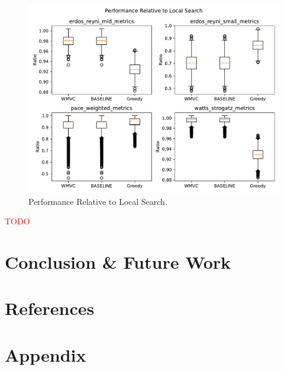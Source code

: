 \documentclass{article}
\begin{document}
\begin{figure}
     \centering
     \includegraphics[width=\textwidth]{figures/local_search}
     \caption{Performance Relative to Local Search.}
     \label{fig:local_search}
\end{figure}
\textcolor{red}{TODO}

\section{Conclusion \& Future Work}
\label{sec:conclusion}

\section{References}



\section{Appendix}
\end{document}
